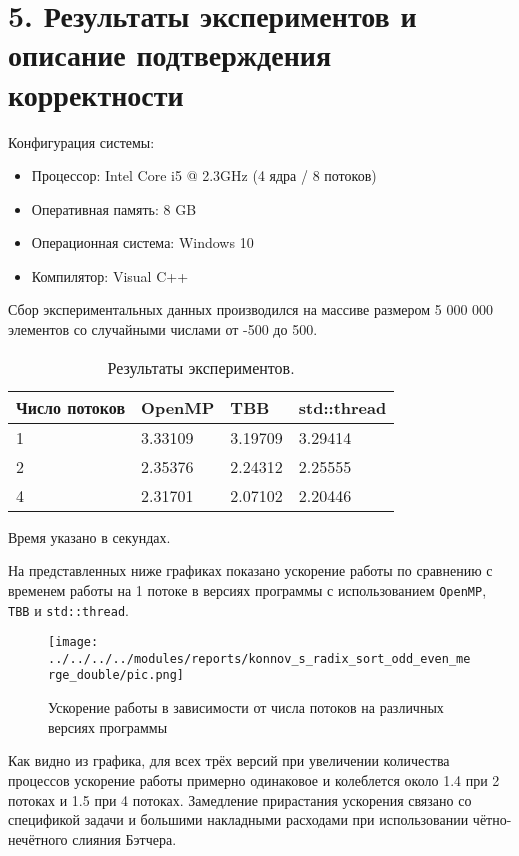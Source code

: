 \documentclass{report}
\begin{document}
    \newpage
    \section*{5. Результаты экспериментов и описание подтверждения корректности}
    \par Конфигурация системы:
    \begin{itemize}
        \item Процессор: Intel Core i5 @ 2.3GHz (4 ядра / 8 потоков)
        \item Оперативная память: 8 GB
        \item Операционная система: Windows 10
        \item Компилятор: Visual C++
    \end{itemize}
    \par Сбор экспериментальных данных производился на массиве размером 5 000 000 элементов со случайными числами от -500 до 500.
    \begin{table}[hbtp]
        \centering
        \begin{tabular}{||l||l|l|l||}
        \hline \hline
        Число потоков & OpenMP  & TBB     & std::thread \\
        \hline \hline
        1             & 3.33109 & 3.19709 & 3.29414     \\
        \hline
        2             & 2.35376 & 2.24312 & 2.25555     \\
        \hline
        4             & 2.31701 & 2.07102 & 2.20446     \\
        \hline \hline
        \end{tabular}
        \caption{Результаты экспериментов.}
        Время указано в секундах.
    \end{table}
    \par На представленных ниже графиках показано ускорение работы по сравнению с временем работы на 1 потоке в версиях программы с использованием \verb|OpenMP|, \verb|TBB| и \verb|std::thread|.
    \begin{figure}[htbp]
        \centering
        \texttt{[image: ../../../../modules/reports/konnov\_s\_radix\_sort\_odd\_even\_merge\_double/pic.png]}
        \caption{Ускорение работы в зависимости от числа потоков на различных версиях программы}
    \end{figure}
    \par Как видно из графика, для всех трёх версий при увеличении количества процессов ускорение работы примерно одинаковое и колеблется около 1.4 при 2 потоках и 1.5 при 4 потоках. 
    Замедление прирастания ускорения связано со спецификой задачи и большими накладными расходами при использовании чётно-нечётного слияния Бэтчера.
\end{document}
